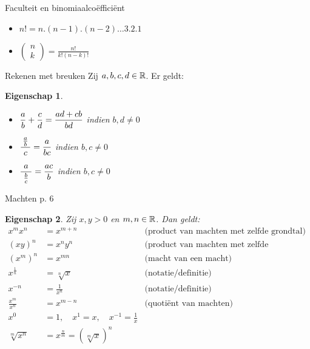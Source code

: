 \documentclass{beamer}
\theoremstyle{eigenschap}
\newtheorem{proposition}{Eigenschap}
\begin{document}
\begin{frame}{Faculteit en binomiaalco\"effici\"ent}
\begin{definition}
\begin{itemize}
	\item[] $n! = n.(n-1).(n-2) \ldots  3.2.1$
	\item[] $\displaystyle \left( \begin{array}{c} n \\ k \end{array} \right) = \frac{n!}{k! (n-k)!}$
\end{itemize}
\end{definition}
\end{frame}

\begin{frame}{Rekenen met breuken}
Zij $a,b,c,d\in \mathbb{R}$. Er geldt:
\begin{proposition}
\begin{itemize}
	\item $\displaystyle{\frac{a}{b}+\frac{c}{d}}=\displaystyle{\frac{ad+cb}{bd}}$ \hspace{3mm}   indien $b,d \neq 0$
	\item $\ds{\frac{\frac{a}{b}}{\ c\ }}=\ds{\frac{a}{bc}}$ \hspace{3mm}   indien $b,c \neq 0$
	\item $\ds{\frac{a}{\ \frac{b}{c}\ }}=\ds{\frac{ac}{b}}$ \hspace{3mm}   indien $b,c \neq 0$
\end{itemize}
\end{proposition}
\end{frame}

\begin{frame}{Machten p. 6}

\small
\begin{proposition}
    Zij $x,y>0$ en $m,n\in\mathbb{R}$. Dan geldt:
    \begin{align*}
    x^{m}x^{n}          &= x^{m+n}     & \text{(product van machten met zelfde grondtal)}\\
    (xy)^n              &= x^ny^n      & \text{(product van machten met zelfde exponent)}\\
    \left(x^{m}\right)^{n}&= x^{mn}    & \text{(macht van een macht)}\\	
    x^{\frac1n} &= \sqrt[n] x          & \text{(notatie/definitie)}\\
    x^{-n}          &= \frac{1}{x^n}  & \text{(notatie/definitie)}\\
    \frac{x^{m}}{x^{n}} &= x^{m-n}      & \text{(quotiënt van machten)} \\
    x^0&=1, \quad x^1=x, \quad x^{-1}=\frac1x \\
    \sqrt[m]{x^n} & = x^{\frac{n}{m}} = (\sqrt[m]{x})^n
    \end{align*}
\end{proposition}
\end{frame}
\end{document}
